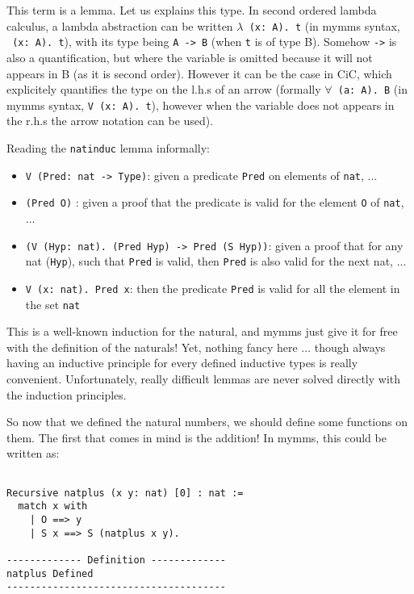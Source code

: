\documentclass[a4paper,5pt,onecolumn]{article}
\begin{document}
This term is a lemma. Let us explains this type. In second ordered
lambda calculus, a lambda abstraction can be written \texttt{$\lambda$
  (x: A). t} (in mymms syntax, \texttt{\ (x: A). t}), with its type
being \texttt{A -> B} (when \texttt{t} is of type B). Somehow
\texttt{->} is also a quantification, but where the variable is
omitted because it will not appears in B (as it is second
order). However it can be the case in CiC, which explicitely
quantifies the type on the l.h.s of an arrow (formally
\texttt{$\forall$ (a: A). B} (in mymms syntax, \texttt{V (x: A). t}),
however when the variable does not appears in the r.h.s the arrow
notation can be used).

Reading the \texttt{natinduc} lemma informally: 
\begin{itemize}
\item \texttt{V (Pred: nat -> Type)}: given a predicate \texttt{Pred}
  on elements of \texttt{nat}, ...
\item \texttt{(Pred O)} : given a proof that the predicate is valid for
  the element \texttt{O} of \texttt{nat}, ...
\item \texttt{(V (Hyp: nat). (Pred Hyp) -> Pred (S Hyp))}: given a
  proof that for any nat (\texttt{Hyp}), such that \texttt{Pred} is
  valid, then \texttt{Pred} is also valid for the next nat, ...
\item \texttt{V (x: nat). Pred x}: then the predicate \texttt{Pred} is
  valid for all the element in the set \texttt{nat}
\end{itemize}

This is a well-known induction for the natural, and mymms just give it
for free with the definition of the naturals! Yet, nothing fancy here
... though always having an inductive principle for every defined
inductive types is really convenient. Unfortunately, really difficult
lemmas are never solved directly with the induction principles.

So now that we defined the natural numbers, we should define some
functions on them. The first that comes in mind is the addition! In
mymms, this could be written as:

\begin{verbatim}

Recursive natplus (x y: nat) [0] : nat :=
  match x with
    | O ==> y
    | S x ==> S (natplus x y).

------------- Definition -------------
natplus Defined
--------------------------------------

\end{verbatim}
\end{document}
